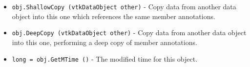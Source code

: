 \begin{itemize}
\item  \verb|obj.ShallowCopy (vtkDataObject other)| -  Copy data from another data object into this one
 which references the same member annotations.

\item  \verb|obj.DeepCopy (vtkDataObject other)| -  Copy data from another data object into this one,
 performing a deep copy of member annotations.

\item  \verb|long = obj.GetMTime ()| -  The modified time for this object.

\end{itemize}
